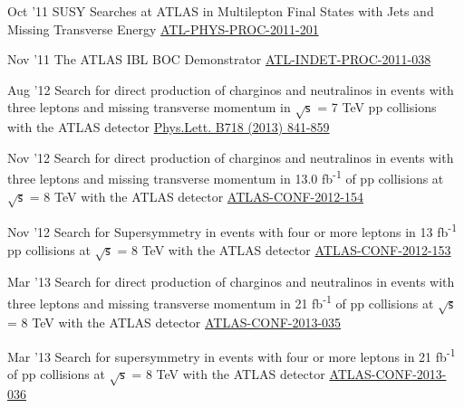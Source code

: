 \documentclass[]{cv} %
\begin{document}
\begin{entrylist}

  \entry
  {Oct '11}
  {{\normalfont SUSY Searches at ATLAS in Multilepton Final States with Jets and Missing Transverse Energy}}
  {\href{https://cds.cern.ch/record/1394331}{ATL-PHYS-PROC-2011-201}}
  {\vspace*{\spacingPubs}}

  \entry
  {Nov '11}
  {{\normalfont The ATLAS IBL BOC Demonstrator}}
  {\href{https://cds.cern.ch/record/1401224}{ATL-INDET-PROC-2011-038}}
  {\vspace*{\spacingPubs}}

  \entry
  {Aug '12}
  {{\normalfont Search for direct production of charginos and neutralinos in events with three leptons and missing transverse momentum in $\sqrt{\mathsf{s}}$ =
  7 TeV pp collisions with the ATLAS detector}}
  {\href{http://dx.doi.org/10.1016/j.physletb.2012.11.039}{Phys.Lett. B718 (2013) 841-859}}
  {\vspace*{\spacingPubs}}

  \entry
  {Nov '12}
  {{\normalfont Search for direct production of charginos and neutralinos in events with three leptons and missing transverse momentum in 13.0
  fb\textsuperscript{-1} of pp collisions at $\sqrt{\mathsf{s}}$ = 8 TeV with the ATLAS detector}}
  {\href{https://cds.cern.ch/record/1493493}{ATLAS-CONF-2012-154}}
  {\vspace*{\spacingPubs}}

  \entry
  {Nov '12}
  {{\normalfont Search for Supersymmetry in events with four or more leptons in 13 fb\textsuperscript{-1} pp collisions at $\sqrt{\mathsf{s}}$
  = 8 TeV with the ATLAS detector}}
  {\href{https://cds.cern.ch/record/1493492}{ATLAS-CONF-2012-153}}
  {\vspace*{\spacingPubs}}

  \entry
  {Mar '13}
  {{\normalfont Search for direct production of charginos and neutralinos in events with three leptons and missing transverse momentum in 21
    fb\textsuperscript{-1} of pp
  collisions at $\sqrt{\mathsf{s}}$ = 8 TeV with the ATLAS detector}}
  {\href{https://cds.cern.ch/record/1532426}{ATLAS-CONF-2013-035}}
  {\vspace*{\spacingPubs}}

  \entry
  {Mar '13}
  {{\normalfont Search for supersymmetry in events with four or more leptons in 21 fb\textsuperscript{-1} of pp collisions at
  $\sqrt{\mathsf{s}}$ = 8 TeV with the ATLAS detector}}
{\href{https://cds.cern.ch/record/1532429}{ATLAS-CONF-2013-036}}
{\vspace*{\spacingPubs}}


\end{entrylist}
\end{document}
